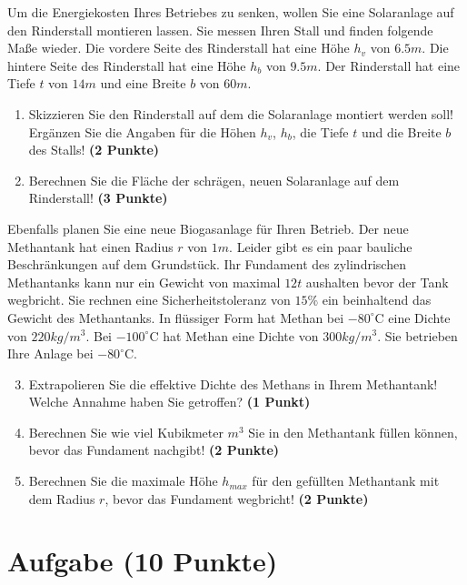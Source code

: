\documentclass[a4paper, 9pt]{scrartcl}\usepackage[]{graphicx}\usepackage[]{xcolor}
\begin{document}
Um die Energiekosten Ihres Betriebes zu senken, wollen Sie eine Solaranlage
auf den Rinderstall montieren lassen. Sie messen Ihren Stall und finden
folgende Ma{\ss}e wieder. Die vordere Seite des Rinderstall hat eine H{\"o}he
$h_v$ von $6.5m$. Die hintere Seite des Rinderstall hat eine
H{\"o}he $h_b$ von $9.5m$. Der Rinderstall hat eine Tiefe $t$ von
$14m$ und eine Breite $b$ von $60m$.

\begin{enumerate}
\item Skizzieren Sie den Rinderstall auf dem die Solaranlage montiert
  werden soll! Erg{\"a}nzen Sie die Angaben f{\"u}r die H{\"o}hen $h_v$, $h_b$, die
  Tiefe $t$ und die Breite $b$ des Stalls!  \textbf{(2 Punkte)}
\item Berechnen Sie die Fl{\"a}che der schr{\"a}gen, neuen Solaranlage auf dem
  Rinderstall! \textbf{(3 Punkte)}
\end{enumerate}

Ebenfalls planen Sie eine neue Biogasanlage f{\"u}r Ihren Betrieb. Der neue
Methantank hat einen Radius $r$ von $1m$. Leider gibt es ein
paar bauliche Beschr{\"a}nkungen auf dem Grundst{\"u}ck. Ihr Fundament des
zylindrischen Methantanks kann nur ein Gewicht von maximal
$12t$ aushalten bevor der Tank wegbricht. Sie rechnen eine
Sicherheitstoleranz von $15\%$ ein beinhaltend das Gewicht des
Methantanks. In fl{\"u}ssiger Form hat
Methan bei $-80^\circ\text{C}$ eine Dichte von
$220kg/m^3$. Bei $-100^\circ\text{C}$ hat Methan eine Dichte
von $300kg/m^3$. Sie betrieben Ihre Anlage bei
$-80^\circ\text{C}$.

\begin{enumerate}
  \setcounter{enumi}{2}
\item Extrapolieren Sie die effektive Dichte des Methans in Ihrem
  Methantank! Welche Annahme haben Sie getroffen? \textbf{(1 Punkt)}
\item Berechnen Sie wie viel Kubikmeter $m^3$ Sie in den Methantank f{\"u}llen
  k{\"o}nnen, bevor das Fundament nachgibt! \textbf{(2 Punkte)}
\item Berechnen Sie die maximale H{\"o}he $h_{max}$ f{\"u}r den gef{\"u}llten
  Methantank mit dem Radius $r$, bevor das Fundament wegbricht! \textbf{(2
    Punkte)}
\end{enumerate}

 
\clearpage

\section{Aufgabe \hfill (10 Punkte)}
\end{document}
